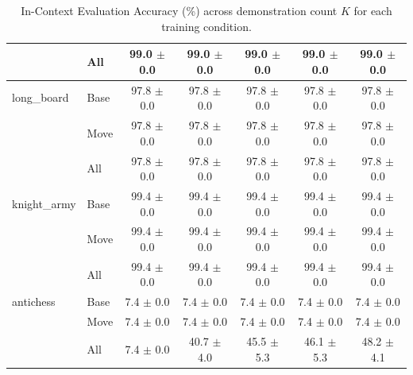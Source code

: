 \begin{table}[t]
\begin{tabular}{llccccc}
 & All & 99.0 $\pm$ 0.0 & 99.0 $\pm$ 0.0 & 99.0 $\pm$ 0.0 & 99.0 $\pm$ 0.0 & 99.0 $\pm$ 0.0 \\
\midrule
long\_board & Base & 97.8 $\pm$ 0.0 & 97.8 $\pm$ 0.0 & 97.8 $\pm$ 0.0 & 97.8 $\pm$ 0.0 & 97.8 $\pm$ 0.0 \\
 & Move & 97.8 $\pm$ 0.0 & 97.8 $\pm$ 0.0 & 97.8 $\pm$ 0.0 & 97.8 $\pm$ 0.0 & 97.8 $\pm$ 0.0 \\
 & All & 97.8 $\pm$ 0.0 & 97.8 $\pm$ 0.0 & 97.8 $\pm$ 0.0 & 97.8 $\pm$ 0.0 & 97.8 $\pm$ 0.0 \\
\midrule
knight\_army & Base & 99.4 $\pm$ 0.0 & 99.4 $\pm$ 0.0 & 99.4 $\pm$ 0.0 & 99.4 $\pm$ 0.0 & 99.4 $\pm$ 0.0 \\
 & Move & 99.4 $\pm$ 0.0 & 99.4 $\pm$ 0.0 & 99.4 $\pm$ 0.0 & 99.4 $\pm$ 0.0 & 99.4 $\pm$ 0.0 \\
 & All & 99.4 $\pm$ 0.0 & 99.4 $\pm$ 0.0 & 99.4 $\pm$ 0.0 & 99.4 $\pm$ 0.0 & 99.4 $\pm$ 0.0 \\
\midrule
antichess & Base & 7.4 $\pm$ 0.0 & 7.4 $\pm$ 0.0 & 7.4 $\pm$ 0.0 & 7.4 $\pm$ 0.0 & 7.4 $\pm$ 0.0 \\
 & Move & 7.4 $\pm$ 0.0 & 7.4 $\pm$ 0.0 & 7.4 $\pm$ 0.0 & 7.4 $\pm$ 0.0 & 7.4 $\pm$ 0.0 \\
 & All & 7.4 $\pm$ 0.0 & 40.7 $\pm$ 4.0 & 45.5 $\pm$ 5.3 & 46.1 $\pm$ 5.3 & 48.2 $\pm$ 4.1 \\
\midrule
\bottomrule
\end{tabular}
\caption{In-Context Evaluation Accuracy (\%) across demonstration count $K$ for each training condition.}
\label{tab:icl_comprehensive}
\end{table}